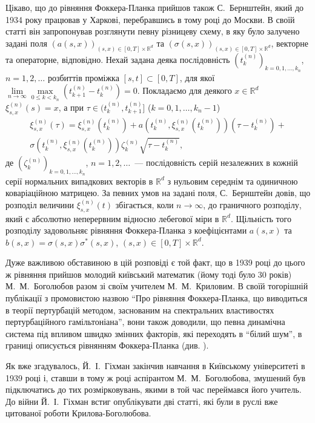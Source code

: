 \documentclass[11pt, reqno]{amsart}
\begin{document}
Цікаво, що до рівняння Фоккера-Планка прийшов також С.~Бернштейн, який до 1934 року працював у Харкові, перебравшись в тому році до Москви. В своїй статті \cite{b4} він запропонував розглянути певну різницеву схему, в яку було залучено задані поля $(a(s,x))_{(s,x)\in[0,T]\times\mathbb{R}^d}$ та $(\sigma(s,x))_{(s,x)\in[0,T]\times\mathbb{R}^d}$, векторне та операторне, відповідно. Нехай задана деяка послідовність $\left(t_k^{(n)}\right)_{k=0,1,\dots,k_n}$, $n=1,2,\dots$ розбиттів проміжка $[s,t]\subset[0,T]$, для якої $\lim\limits_{n\to\infty}\max\limits_{0\le k<k_n}(t_{k+1}^{(n)}-t_k^{(n)})=0$. Покладаємо для деякого $x\in\mathbb{R}^d$ $\xi_{s,x}^{(n)}(s)=x$, а при $\tau\in(t_k^{(n)}, t_{k+1}^{(n)}]$ ($k=0,1,\dots,k_n-1$)
\[
\begin{split}
\xi_{s,x}^{(n)}(\tau)=\xi_{s,x}^{(n)}(t_k^{(n)})+a\left(t_k^{(n)},\xi_{s,x}^{(n)}(t_k^{(n)})\right) \left(\tau-t_k^{(n)}\right)+\\
 \sigma\left(t_k^{(n)},\xi_{s,x}^{(n)}(t_k^{(n)})\right) \zeta_k^{(n)}\sqrt{\tau-t_k^{(n)}},
\end{split}
\]
де $\left(\zeta_k^{(n)}\right)_{k=0,1,\dots,k_n}$, $n=1,2,\dots$~--- послідовність серій незалежних в кожній серії нормальних випадкових векторів в $\mathbb{R}^d$ з нульовим середнім та одиничною коваріаційною матрицею. За певних умов на задані поля, С.~Бернштейн довів, що розподіл величини $\xi_{s,x}^{(n)}(t)$ збігається, коли $n\to\infty$, до граничного розподілу, який є абсолютно неперервним відносно лебегової міри в $\mathbb{R}^d$. Щільність того розподілу задовольняє рівняння Фоккера-Планка з коефіцієнтами $a(s,x)$ та $b(s,x)=\sigma(s,x)\sigma^*(s,x)$, $(s,x)\in[0,T]\times\mathbb{R}^d$.

Дуже важливою обставиною в цій розповіді є той факт, що в 1939 році до цього ж рівняння прийшов молодий київський математик (йому тоді було 30 років) М.~М.~Боголюбов разом зі своїм учителем М.~М.~Криловим. В своїй тогорішній публікації з промовистою назвою ``Про рівняння Фоккера-Планка, що виводиться в теорії пертурбацій методом, заснованим на спектральних властивостях пертурбаційного гамільтоніана'', вони також доводили, що певна динамічна система під впливом швидко змінних факторів, які переходять в ``білий шум'', в границі описується рівнянням Фоккера-Планка (див. \cite{b5}).

Як вже згадувалось, Й.~І.~Гіхман закінчив навчання в Київському університеті в 1939 році і, ставши в тому ж році аспірантом М.~М.~Боголюбова, змушений був підключатись до тих розмірковувань, якими в той час переймався його учитель. До війни Й.~І.~Гіхман встиг опублікувати дві статті, які були в руслі вже цитованої роботи Крилова-Боголюбова.
\end{document}
